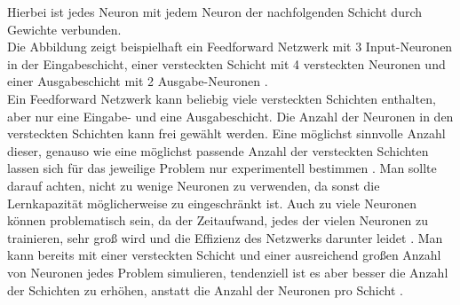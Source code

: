 Hierbei ist jedes Neuron mit jedem Neuron der nachfolgenden Schicht durch Gewichte verbunden.\\
Die Abbildung zeigt beispielhaft ein Feedforward Netzwerk mit 3 Input-Neuronen in der Eingabeschicht, einer versteckten Schicht mit 4 versteckten Neuronen und einer Ausgabeschicht mit 2 Ausgabe-Neuronen \cite{Bishop1995}.\\
Ein Feedforward Netzwerk kann beliebig viele versteckten Schichten enthalten, aber nur eine Eingabe- und eine Ausgabeschicht. Die Anzahl der Neuronen in den versteckten Schichten kann frei gew\"ahlt werden. Eine möglichst sinnvolle Anzahl dieser, genauso wie eine möglichst passende Anzahl der versteckten Schichten lassen sich für das jeweilige Problem nur experimentell bestimmen \cite{handson}. Man sollte darauf achten, nicht zu wenige Neuronen zu verwenden, da sonst die Lernkapazit\"at m\"oglicherweise zu eingeschr\"ankt ist. Auch zu viele Neuronen k\"onnen problematisch sein, da der Zeitaufwand, jedes der vielen Neuronen zu trainieren, sehr groß wird und die Effizienz des Netzwerks darunter leidet \cite{Rashid}. Man kann bereits mit einer versteckten Schicht und einer ausreichend gro\ss en Anzahl von Neuronen jedes Problem simulieren, tendenziell ist es aber besser die Anzahl der Schichten zu erh\"ohen, anstatt die Anzahl der Neuronen pro Schicht \cite{handson}. 



